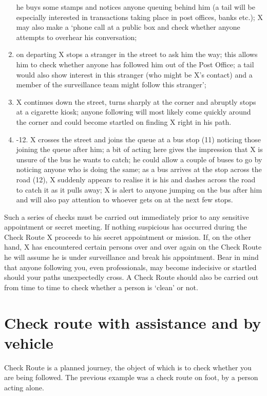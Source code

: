 \begin{enumerate}
  he buys some stamps and notices anyone queuing behind him (a tail will
  be especially interested in transactions taking place in post offices,
  banks etc.); X may also make a `phone call at a public box and check
  whether anyone attempts to overhear his conversation;
\item
  on departing X stops a stranger in the street to ask him the way; this
  allows him to check whether anyone has followed him out of the Post
  Office; a tail would also show interest in this stranger (who might be
  X's contact) and a member of the surveillance team might follow this
  stranger';
\item
  X continues down the street, turns sharply at the corner and abruptly
  stops at a cigarette kiosk; anyone following will most likely come
  quickly around the corner and could become startled on finding X right
  in his path.
\item
  -12. X crosses the street and joins the queue at a bus stop (11)
  noticing those joining the queue after him; a bit of acting here gives
  the impression that X is unsure of the bus he wants to catch; he could
  allow a couple of buses to go by noticing anyone who is doing the
  same; as a bus arrives at the stop across the road (12), X suddenly
  appears to realise it is his and dashes across the road to catch it as
  it pulls away; X is alert to anyone jumping on the bus after him and
  will also pay attention to whoever gets on at the next few stops.
\end{enumerate}

Such a series of checks must be carried out immediately prior to any
sensitive appointment or secret meeting. If nothing suspicious has
occurred during the Check Route X proceeds to his secret appointment or
mission. If, on the other hand, X has encountered certain persons over
and over again on the Check Route he will assume he is under
surveillance and break his appointment. Bear in mind that anyone
following you, even professionals, may become indecisive or startled
should your paths unexpectedly cross. A Check Route should also be
carried out from time to time to check whether a person is `clean' or
not.

\section{Check route with assistance and by vehicle}

Check Route is a planned journey, the object of which is to check
whether you are being followed. The previous example was a check route
on foot, by a person acting alone.

